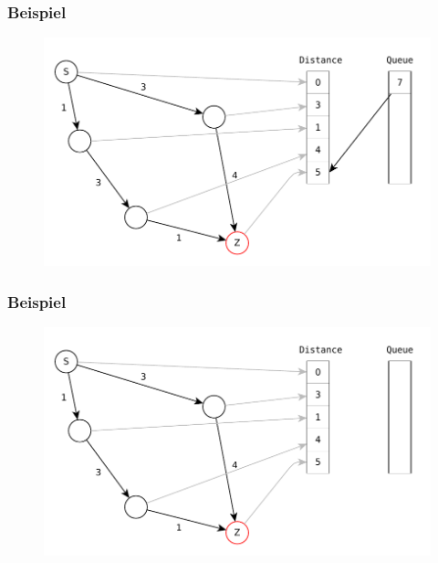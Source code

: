 \begin{frame}
\frametitle{Beispiel}
\begin{figure}
\includegraphics[scale=.8]{dijkstra_graphs/dijkstra_A.pdf}
\end{figure}
\end{frame}

\begin{frame}
\frametitle{Beispiel}
\begin{figure}
\includegraphics[scale=.8]{dijkstra_graphs/dijkstra_B.pdf}
\end{figure}
\end{frame}